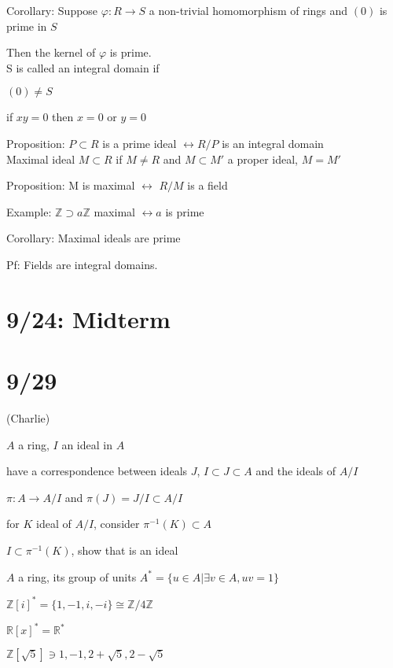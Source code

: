 \documentclass[12pt]{article}
\begin{document}
\noindent
Corollary: Suppose $\varphi: R \to S$ a non-trivial homomorphism of rings and $(0)$ is prime in $S$

Then the kernel of $\varphi$ is prime.\\

\noindent
S is called an integral domain if 

$(0) \neq S$

if $xy = 0$ then $x = 0$ or $y = 0$

\noindent
Proposition: $P \subset R$ is a prime ideal $\leftrightarrow R/P$ is an integral domain\\

\noindent
Maximal ideal $M \subset R$ if $M \neq R$ and $M \subset M'$ a proper ideal, $M = M'$

\noindent
Proposition: M is maximal $\leftrightarrow$ $R/M$ is a field

\noindent
Example: $\mathds{Z} \supset a\mathds{Z}$ maximal $\leftrightarrow a$ is prime

\noindent
Corollary: Maximal ideals are prime

Pf: Fields are integral domains.

\section{9/24: Midterm}

\section{9/29}

(Charlie)

\noindent
$A$ a ring, $I$ an ideal in $A$

have a correspondence between ideals $J$, $I \subset J \subset A$ and the ideals of $A/I$

$\pi: A \to A/I$ and $\pi(J) = J/I \subset A/I$

for $K$ ideal of $A/I$, consider $\pi^{-1}(K) \subset A$

$I \subset \pi^{-1}(K)$, show that is an ideal

\noindent
$A$ a ring, its group of units $A^* = \{u \in A | \exists v \in A, uv = 1\}$

$\mathds{Z}[i]^* = \{1, -1, i, -i\} \cong \mathds{Z}/4\mathds{Z}$

$\mathds{R}[x]^* = \mathds{R}^*$

$\mathds{Z}[\sqrt{5}] \ni 1, -1, 2 + \sqrt{5}, 2 - \sqrt{5}$\\
\end{document}
